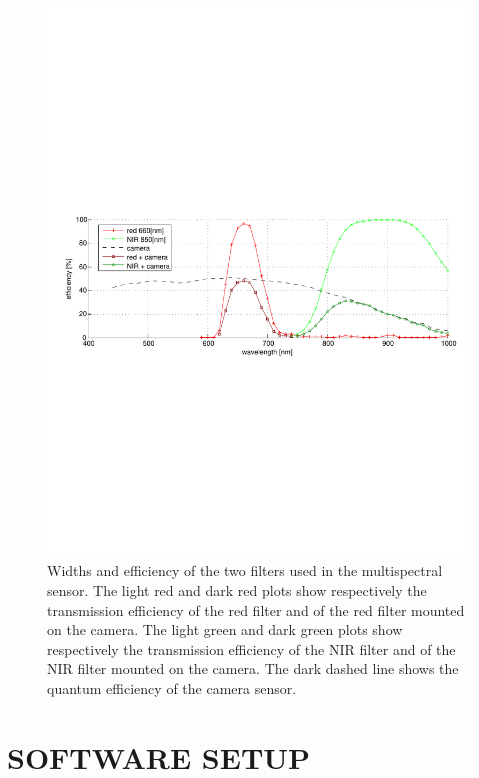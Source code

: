 \documentclass[a4paper, 10pt, conference]{ieeeconf}      %
\begin{document}
   \begin{figure}[t]
      \centering
      \includegraphics[trim = 10mm 99mm 10mm 99mm, clip,width=0.99\linewidth]{../images/plot_reflectance.pdf}
      \caption{Widths and efficiency of the two filters used in the multispectral sensor. The light red and dark red plots show respectively the transmission efficiency of the red filter and of the red  filter mounted on the camera. The light green and dark green plots show respectively the transmission efficiency of the NIR filter and of the NIR  filter mounted on the camera. The dark dashed line shows the quantum efficiency of the camera sensor.}
     \label{fig:reflectance}
   \end{figure}


\section{SOFTWARE SETUP}\label{sec:software_setup}
\end{document}
